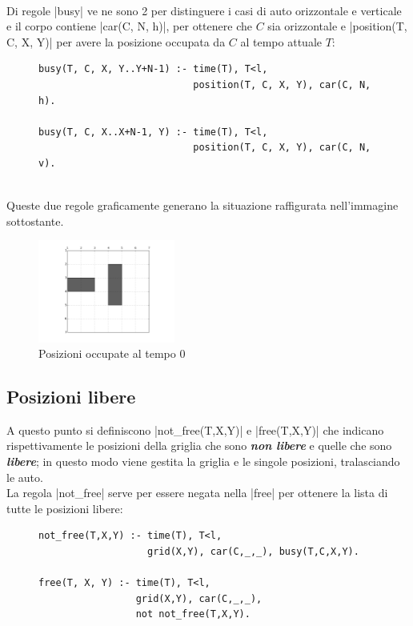 \documentclass[10pt, a4paper, oneside]{article}
\begin{document}
\noindent
\\Di regole |busy| ve ne sono 2 per distinguere i casi di auto orizzontale e verticale e il corpo contiene |car(C, N, h)|, per ottenere che $C$ sia orizzontale e |position(T, C, X, Y)| per avere la posizione occupata da $C$ al tempo attuale $T$:

\begin{figure}[H]
\centering
\begin{verbatim}
busy(T, C, X, Y..Y+N-1) :- time(T), T<l, 
                           position(T, C, X, Y), car(C, N, h).

busy(T, C, X..X+N-1, Y) :- time(T), T<l, 
                           position(T, C, X, Y), car(C, N, v).
\end{verbatim}
\label{code:busy}
\end{figure}


\noindent
\\Queste due regole graficamente generano la situazione raffigurata nell'immagine sottostante.
\begin{figure}[H]
  \centering
  \includegraphics[width=0.4\textwidth]{images/busy.PNG}
  \caption{Posizioni occupate al tempo 0}
  \label{fig:}
\end{figure}



\subsection{Posizioni libere}
A questo punto si definiscono |not_free(T,X,Y)| e |free(T,X,Y)| che indicano rispettivamente le posizioni della griglia che sono \emph{\textbf{non libere}} e quelle che sono \emph{\textbf{libere}}; in questo modo viene gestita la griglia e le singole posizioni, tralasciando le auto. \\

\noindent
La regola |not_free| serve per essere negata nella |free| per ottenere la lista di tutte le posizioni libere:
\begin{figure}[H]
\centering
\begin{verbatim}
not_free(T,X,Y) :- time(T), T<l, 
                   grid(X,Y), car(C,_,_), busy(T,C,X,Y).

free(T, X, Y) :- time(T), T<l, 
                 grid(X,Y), car(C,_,_), 
                 not not_free(T,X,Y).
\end{verbatim}
\label{code:free}
\end{figure}
\end{document}
